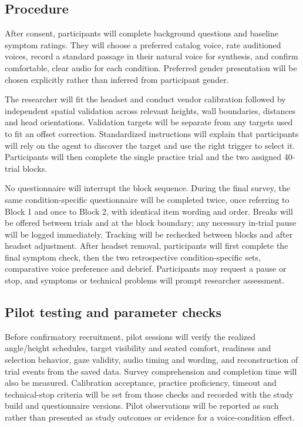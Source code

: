 \documentclass[11pt,letterpaper]{article}
\begin{document}
\subsection{Procedure}
After consent, participants will complete background questions and baseline symptom ratings. They will choose a preferred catalog voice, rate auditioned voices, record a standard passage in their natural voice for synthesis, and confirm comfortable, clear audio for each condition. Preferred gender presentation will be chosen explicitly rather than inferred from participant gender.

The researcher will fit the headset and conduct vendor calibration followed by independent spatial validation across relevant heights, wall boundaries, distances and head orientations. Validation targets will be separate from any targets used to fit an offset correction. Standardized instructions will explain that participants will rely on the agent to discover the target and use the right trigger to select it. Participants will then complete the single practice trial and the two assigned 40-trial blocks.

No questionnaire will interrupt the block sequence. During the final survey, the same condition-specific questionnaire will be completed twice, once referring to Block 1 and once to Block 2, with identical item wording and order. Breaks will be offered between trials and at the block boundary; any necessary in-trial pause will be logged immediately. Tracking will be rechecked between blocks and after headset adjustment. After headset removal, participants will first complete the final symptom check, then the two retrospective condition-specific sets, comparative voice preference and debrief. Participants may request a pause or stop, and symptoms or technical problems will prompt researcher assessment.

\subsection{Pilot testing and parameter checks}
Before confirmatory recruitment, pilot sessions will verify the realized angle/height schedules, target visibility and seated comfort, readiness and selection behavior, gaze validity, audio timing and wording, and reconstruction of trial events from the saved data. Survey comprehension and completion time will also be measured. Calibration acceptance, practice proficiency, timeout and technical-stop criteria will be set from those checks and recorded with the study build and questionnaire versions. Pilot observations will be reported as such rather than presented as study outcomes or evidence for a voice-condition effect.
\end{document}
